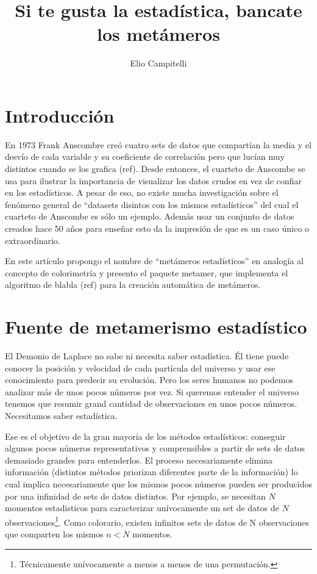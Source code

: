 \documentclass[runningheads,spanish]{llncs}
\begin{document}
%
\title{Si te gusta la estadística, bancate los metámeros}
%
%
\author{
Elio Campitelli }



%
\maketitle
%

 



\section{Introducción}

En 1973 Frank Anscombre creó cuatro sets de datos que compartían la
media y el desvío de cada variable y su coeficiente de correlación pero
que lucían muy distintos cuando se los grafica (ref). Desde entonces, el
cuarteto de Anscombe se usa para ilustrar la importancia de visualizar
los datos crudos en vez de confiar en los estadísticos. A pesar de eso,
no existe mucha investigación sobre el fenómeno general de ``datasets
disintos con los mismos estadísticos'' del cual el cuarteto de Anscombe
es sólo un ejemplo. Además usar un conjunto de datos creados hace 50
años para enseñar esto da la impresión de que es un caso único o
extraordinario.

En este artículo propongo el nombre de ``metámeros estadísticos'' en
analogía al concepto de colorimetría y presento el paquete metamer, que
implementa el algoritmo de blabla (ref) para la creación automática de
metámeros.

\section{Fuente de metamerismo estadístico}

El Demonio de Laplace no sabe ni necesita saber estadística. Él tiene
puede conocer la posición y velocidad de cada partícula del universo y
usar ese conocimiento para predecir su evolución. Pero los seres humanos
no podemos analizar más de unos pocos números por vez. Si queremos
entender el universo tenemos que resumir grand cantidad de observaciones
en unos pocos números. Necesitamos saber estadística.

Ese es el objetivo de la gran mayoría de los métodos estadísticos:
conseguir algunos pocos números representativos y comprensibles a partir
de sets de datos demasiado grandes para entenderlos. El proceso
necesariamente elimina información (distintos métodos priorizan
diferentes parte de la información) lo cual implica necesariamente que
los mismos pocos números pueden ser producidos por una infinidad de sets
de datos distintos. Por ejemplo, se necesitan \(N\) momentos
estadisticos para caracterizar unívocamente un set de datos de \(N\)
observaciones\footnote{Técnicamente unívocamente a menos a menos de una permutación.}.
Como colorario, existen infinitos sets de datos de N observaciones que
comparten los mismos \(n < N\) momentos.
\end{document}
